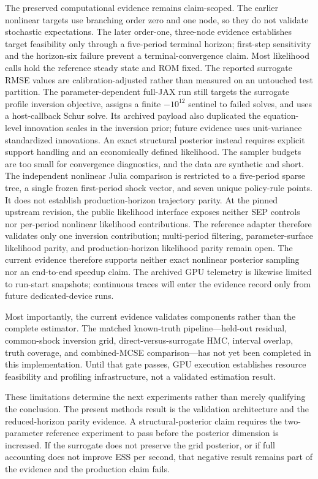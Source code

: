 \documentclass[11pt]{article}
\begin{document}
The preserved computational evidence remains claim-scoped. The earlier nonlinear targets
use branching order zero and one node, so they do not validate stochastic
expectations. The later order-one, three-node evidence establishes target
feasibility only through a five-period terminal horizon; first-step sensitivity
and the horizon-six failure prevent a terminal-convergence claim. Most
likelihood calls hold the reference steady state and ROM fixed. The reported
surrogate RMSE values are calibration-adjusted rather than measured on an
untouched test partition. The parameter-dependent full-JAX run still targets
the surrogate profile inversion objective, assigns a finite $-10^{12}$ sentinel
to failed solves, and uses a host-callback Schur solve. Its archived payload also
duplicated the equation-level innovation scales in the inversion prior; future
evidence uses unit-variance standardized innovations. An exact structural
posterior instead requires explicit support handling and an economically
defined likelihood. The sampler budgets are too small for convergence
diagnostics, and the data are synthetic and short. The independent nonlinear
Julia comparison is restricted to a five-period sparse tree, a single frozen
first-period shock vector, and seven unique policy-rule points. It does not
establish production-horizon trajectory parity. At the pinned
upstream revision, the public likelihood interface exposes neither SEP controls
nor per-period nonlinear likelihood contributions. The reference adapter
therefore validates only one inversion contribution; multi-period filtering,
parameter-surface likelihood parity, and production-horizon likelihood parity
remain open. The current
evidence therefore supports neither exact nonlinear posterior sampling nor an
end-to-end speedup claim. The archived GPU telemetry is likewise limited to
run-start snapshots; continuous traces will enter the evidence record only from
future dedicated-device runs.

Most importantly, the current evidence validates components rather than the
complete estimator. The matched known-truth pipeline---held-out residual,
common-shock inversion grid, direct-versus-surrogate HMC, interval overlap,
truth coverage, and combined-MCSE comparison---has not yet been completed in
this implementation. Until that gate passes, GPU execution establishes resource
feasibility and profiling infrastructure, not a validated estimation result.

These limitations determine the next experiments rather than merely qualifying
the conclusion. The present methods result is the validation architecture and
the reduced-horizon parity evidence. A structural-posterior claim requires the
two-parameter reference experiment to pass before the posterior dimension is
increased. If the surrogate does not preserve the grid posterior, or if full
accounting does not improve ESS per second, that negative result remains part
of the evidence and the production claim fails.
\end{document}
